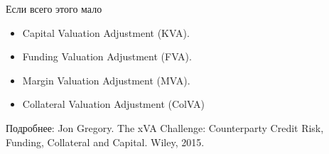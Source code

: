\documentclass{beamer}
\begin{document}
\begin{frame}{Если всего этого мало}
\begin{itemize}
\justifying
\item Capital Valuation Adjustment (KVA).
\item Funding Valuation Adjustment (FVA).
\item Margin Valuation Adjustment (MVA).
\item Collateral Valuation Adjustment (ColVA)
\end{itemize}

\justify
Подробнее: Jon Gregory. The xVA Challenge: Counterparty Credit Risk, Funding, Collateral and Capital. Wiley, 2015.
\end{frame}
\end{document}
